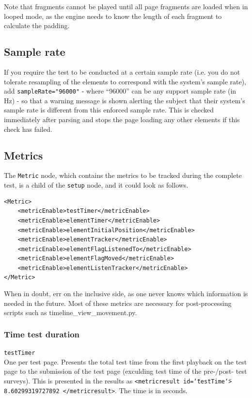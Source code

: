\documentclass[11pt, oneside]{article}   	%
\begin{document}
		Note that fragments cannot be played until all page fragments are loaded when in looped mode, as the engine needs to know the length of each fragment to calculate the padding.

	\subsection{Sample rate}
	\label{sec:samplerate}
		If you require the test to be conducted at a certain sample rate (i.e. you do not tolerate resampling of the elements to correspond with the system's sample rate), add \texttt{sampleRate="96000"} - where ``96000'' can be any support sample rate (in Hz) - so that a warning message is shown alerting the subject that their system's sample rate is different from this enforced sample rate. This is checked immediately after parsing and stops the page loading any other elements if this check has failed.

	\subsection{Metrics}
		The \texttt{Metric} node, which contains the metrics to be tracked during the complete test, is a child of the \texttt{setup} node, and it could look as follows.

		\begin{lstlisting}
<Metric>
	<metricEnable>testTimer</metricEnable>
	<metricEnable>elementTimer</metricEnable>
	<metricEnable>elementInitialPosition</metricEnable>
	<metricEnable>elementTracker</metricEnable>
	<metricEnable>elementFlagListenedTo</metricEnable>
	<metricEnable>elementFlagMoved</metricEnable>
	<metricEnable>elementListenTracker</metricEnable>
</Metric>
		\end{lstlisting}

		When in doubt, err on the inclusive side, as one never knows which information is needed in the future. Most of these metrics are necessary for post-processing scripts such as timeline\_view\_movement.py. %

		\subsubsection{Time test duration}
			\texttt{testTimer}\\
			One per test page. Presents the total test time from the first playback on the test page to the submission of the test page (exculding test time of the pre-/post- test surveys). This is presented in the results as \texttt{<metricresult id=\texttt{\char`\"}testTime\texttt{\char`\"}> 8.60299319727892 </metricresult>}. The time is in seconds.
\end{document}
